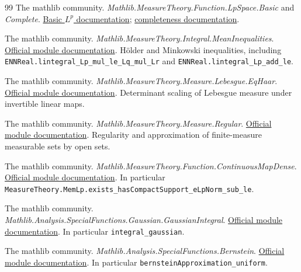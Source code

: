 \documentclass[11pt]{article}
\theoremstyle{remark}\newtheorem{remark}[theorem]{Remark}
\begin{document}
\begin{thebibliography}{99}
The mathlib community. \emph{Mathlib.MeasureTheory.Function.LpSpace.Basic} and \emph{Complete}.
\href{https://leanprover-community.github.io/mathlib4_docs/Mathlib/MeasureTheory/Function/LpSpace/Basic.html}{Basic $L^p$ documentation};
\href{https://leanprover-community.github.io/mathlib4_docs/Mathlib/MeasureTheory/Function/LpSpace/Complete.html}{completeness documentation}.

The mathlib community. \emph{Mathlib.MeasureTheory.Integral.MeanInequalities}.
\href{https://leanprover-community.github.io/mathlib4_docs/Mathlib/MeasureTheory/Integral/MeanInequalities.html}{Official module documentation}.
H\"older and Minkowski inequalities, including
\texttt{ENNReal.\allowbreak lintegral\_\allowbreak Lp\_\allowbreak mul\_\allowbreak le\_\allowbreak Lq\_\allowbreak mul\_\allowbreak Lr} and
\texttt{ENNReal.\allowbreak lintegral\_\allowbreak Lp\_\allowbreak add\_\allowbreak le}.

The mathlib community. \emph{Mathlib.MeasureTheory.Measure.Lebesgue.EqHaar}.
\href{https://leanprover-community.github.io/mathlib4_docs/Mathlib/MeasureTheory/Measure/Lebesgue/EqHaar.html}{Official module documentation}.
Determinant scaling of Lebesgue measure under invertible linear maps.

The mathlib community. \emph{Mathlib.MeasureTheory.Measure.Regular}.
\href{https://leanprover-community.github.io/mathlib4_docs/Mathlib/MeasureTheory/Measure/Regular.html}{Official module documentation}.
Regularity and approximation of finite-measure measurable sets by open sets.

The mathlib community. \emph{Mathlib.MeasureTheory.Function.ContinuousMapDense}.
\href{https://leanprover-community.github.io/mathlib4_docs/Mathlib/MeasureTheory/Function/ContinuousMapDense.html}{Official module documentation}.
In particular \texttt{MeasureTheory.\allowbreak MemLp.\allowbreak exists\_\allowbreak hasCompactSupport\_\allowbreak eLpNorm\_\allowbreak sub\_\allowbreak le}.

The mathlib community. \emph{Mathlib.Analysis.SpecialFunctions.Gaussian.GaussianIntegral}.
\href{https://leanprover-community.github.io/mathlib4_docs/Mathlib/Analysis/SpecialFunctions/Gaussian/GaussianIntegral.html}{Official module documentation}.
In particular \texttt{integral\_\allowbreak gaussian}.

The mathlib community. \emph{Mathlib.Analysis.SpecialFunctions.Bernstein}.
\href{https://leanprover-community.github.io/mathlib4_docs/Mathlib/Analysis/SpecialFunctions/Bernstein.html}{Official module documentation}.
In particular \texttt{bernsteinApproximation\_\allowbreak uniform}.


\end{thebibliography}
\end{document}

